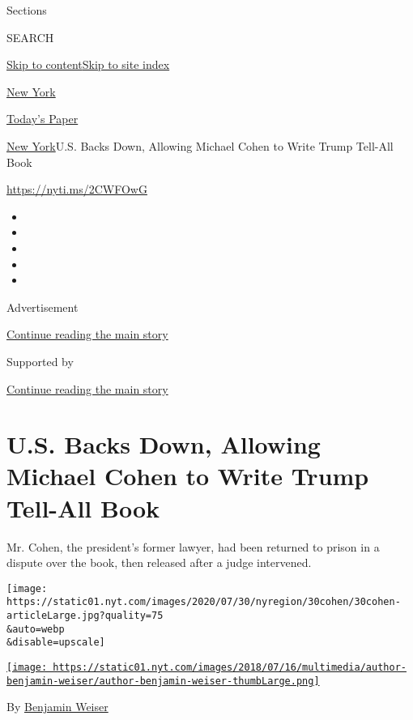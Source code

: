 Sections

SEARCH

\protect\hyperlink{site-content}{Skip to
content}\protect\hyperlink{site-index}{Skip to site index}

\href{https://www.nytimes.com/section/nyregion}{New York}

\href{https://myaccount.nytimes.com/auth/login?response_type=cookie\&client_id=vi}{}

\href{https://www.nytimes.com/section/todayspaper}{Today's Paper}

\href{/section/nyregion}{New York}\textbar{}U.S. Backs Down, Allowing
Michael Cohen to Write Trump Tell-All Book

\url{https://nyti.ms/2CWFOwG}

\begin{itemize}
\item
\item
\item
\item
\item
\end{itemize}

Advertisement

\protect\hyperlink{after-top}{Continue reading the main story}

Supported by

\protect\hyperlink{after-sponsor}{Continue reading the main story}

\hypertarget{us-backs-down-allowing-michael-cohen-to-write-trump-tell-all-book}{%
\section{U.S. Backs Down, Allowing Michael Cohen to Write Trump Tell-All
Book}\label{us-backs-down-allowing-michael-cohen-to-write-trump-tell-all-book}}

Mr. Cohen, the president's former lawyer, had been returned to prison in
a dispute over the book, then released after a judge intervened.

\texttt{[image: https://static01.nyt.com/images/2020/07/30/nyregion/30cohen/30cohen-articleLarge.jpg?quality=75\\\&auto=webp\\\&disable=upscale]}

\href{https://www.nytimes.com/by/benjamin-weiser}{\texttt{[image: https://static01.nyt.com/images/2018/07/16/multimedia/author-benjamin-weiser/author-benjamin-weiser-thumbLarge.png]}}

By \href{https://www.nytimes.com/by/benjamin-weiser}{Benjamin Weiser}

